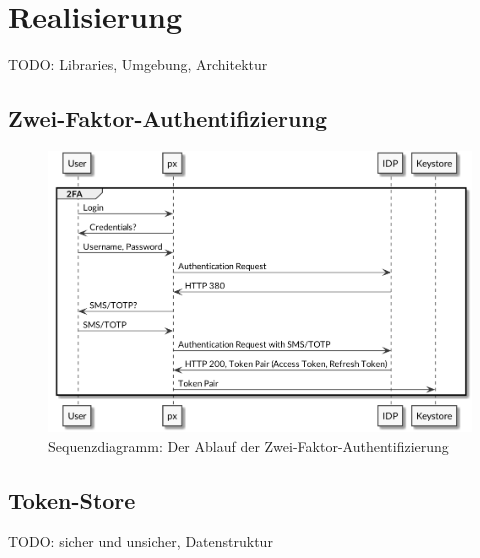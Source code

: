 \section{Realisierung}
\label{sec:Realisierung}

TODO: Libraries, Umgebung, Architektur

\subsection{Zwei-Faktor-Authentifizierung}

\begin{figure}
    \centering
    \includegraphics[width=\linewidth]{pics/sequence-2fa.png}
    \caption{Sequenzdiagramm: Der Ablauf der Zwei-Faktor-Authentifizierung}
\end{figure}

\subsection{Token-Store}

TODO: sicher und unsicher, Datenstruktur
